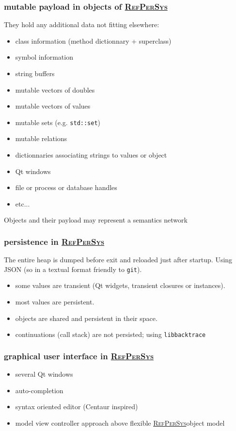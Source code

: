 \documentclass[xcolor=svgnames,final,smaller,a4]{beamer}
\newcommand{\RefPerSys}{\href{http://refpersys.org}{\textsc{RefPerSys}}}
\begin{document}
  \begin{frame}
    \frametitle{mutable payload in objects of \RefPerSys}

    They hold any additional data not fitting elsewhere:
    \begin{itemize}
    \item class information (method dictionnary + superclass)
    \item symbol information
    \item string buffers
    \item mutable vectors of doubles
    \item mutable vectors of values
    \item mutable sets (e.g. \texttt{std::set})
    \item mutable relations
    \item dictionnaries associating strings to values or object
    \item Qt windows
    \item file or process or database handles
    \item etc...
    \end{itemize}

    Objects and their payload may represent a semantics network
  \end{frame}
   
  \begin{frame}
    \frametitle{persistence in \RefPerSys}
    The entire heap is dumped before exit and reloaded just after startup. Using JSON (so in a textual format friendly to \texttt{git}).

    \begin{itemize}
    \item some values are transient (Qt widgets, transient closures or instances).
    \item most values are persistent.
    \item objects are shared and persistent in their space.
    \item continuations (call stack) are not persisted; using \texttt{libbacktrace}
    \end{itemize}
  \end{frame}

  \begin{frame}
    \frametitle{graphical user interface in \RefPerSys}
    \begin{itemize}
    \item several Qt windows
    \item auto-completion
    \item syntax oriented editor (Centaur inspired)
    \item model view controller approach above flexible \RefPerSys object model
    \end{itemize}
  \end{frame}
  
\end{document}
